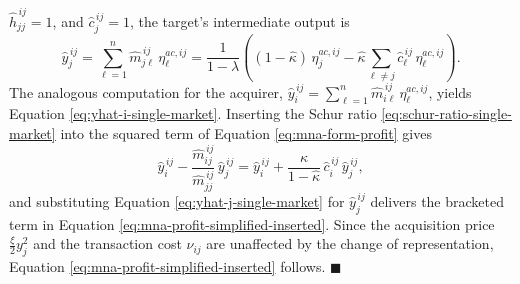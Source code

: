 $\widehat h_{jj}^{\,ij}=1$, and $\widehat c_j^{\,ij}=1$, the target's
intermediate output is
\begin{equation}
\widehat y_j^{\,ij}
=
\sum_{\ell=1}^n \widehat m_{j\ell}^{\,ij}\,\eta_\ell^{ac,ij}
=
\frac{1}{1-\lambda}
\left(
(1-\widehat\kappa)\,\eta_j^{ac,ij}
-
\widehat\kappa
\sum_{\ell \neq j}
\widehat c_\ell^{\,ij}\,\eta_\ell^{ac,ij}
\right).
\label{eq:yhat-j-single-market}
\end{equation}
The analogous computation for the acquirer,
$\widehat y_i^{\,ij}=\sum_{\ell=1}^n \widehat m_{i\ell}^{\,ij}\,
\eta_\ell^{ac,ij}$, yields Equation \eqref{eq:yhat-i-single-market}.
Inserting the Schur ratio \eqref{eq:schur-ratio-single-market} into the squared
term of Equation \eqref{eq:mna-form-profit} gives
\begin{equation*}
\widehat y_i^{\,ij}
-
\frac{\widehat m_{ij}^{\,ij}}{\widehat m_{jj}^{\,ij}}\,
\widehat y_j^{\,ij}
=
\widehat y_i^{\,ij}
+
\frac{\widehat\kappa}{1-\widehat\kappa}\,
\widehat c_i^{\,ij}\,
\widehat y_j^{\,ij},
\end{equation*}
and substituting Equation \eqref{eq:yhat-j-single-market} for
$\widehat y_j^{\,ij}$ delivers the bracketed term in Equation
\eqref{eq:mna-profit-simplified-inserted}. Since the acquisition price
$\frac{\xi}{2}y_j^2$ and the transaction cost $\nu_{ij}$ are unaffected by
the change of representation, Equation
\eqref{eq:mna-profit-simplified-inserted} follows. 
\hfill$\blacksquare$

